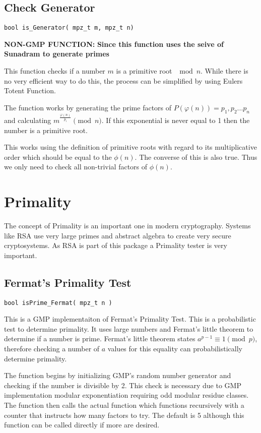 \subsection{Check Generator}
\begin{verbatim}
bool is_Generator( mpz_t m, mpz_t n)
\end{verbatim}
\textbf{ NON-GMP FUNCTION:}
\textbf{Since this function uses the seive of Sunadram to generate primes } 

This function checks if a number $m$ is a primitive root $\mod n$.
While there is no very efficient way to do this, the process can be simplified by using Eulers Totent Function.

The function works by generating the prime factors of $P(\varphi(n)) = p_1,p_2 ... p_n $ and calculating $m^{\frac{\varphi(n)}{p_i}} \pmod n$.
If this exponential is never equal to 1 then the number is a primitive root.

This works using the definition of primitive roots with regard to its multiplicative order which should be equal to the $\phi(n)$. 
The converse of this is also true. Thus we only need to check all non-trivial factors of $\phi(n)$.

\section{Primality}

The concept of Primality is an important one in modern cryptography.
Systems like RSA use very large primes and abstract algebra to create very secure cryptosystems.
As RSA is part of this package a Primality tester is very important.

\subsection{Fermat's Primality Test}
\begin{verbatim}
bool isPrime_Fermat( mpz_t n )
\end{verbatim}

This is a GMP implementaiton of Fermat's Primality Test.
This is a probabilistic test to determine primality.
It uses large numbers and Fermat's little theorem to determine if a number is prime.
Fermat's little theorem states $a^{p-1} \equiv 1 \pmod p$, therefore checking a number of $a$ values for this equality can probabilistically determine primality.

The function begins by initializing GMP's random number generator and checking if the number is divisible by 2.
This check is necessary due to GMP implementation modular exponentiation requiring odd modular residue classes.
The function then calls the actual function which functions recursively with a counter that instructs how many factors to try.
The default is 5 although this function can be called directly if more are desired.


